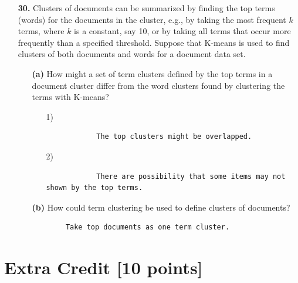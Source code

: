 \documentclass{article}
\begin{document}
\begin{enumerate}
\begin{verbatim}
	
	\end{verbatim}
	
		
	\item[\textbf{30.}] Clusters of documents can be summarized by finding the top terms (words) for the documents in the cluster, e.g., by taking the most frequent $k$ terms, where $k$ is a constant, say 10, or by taking all terms that occur more frequently than a specified threshold. Suppose that K-means is used to find clusters of both documents and words for a document data set.
	\begin{enumerate}
		\item [\textbf{(a)}] How might a set of term clusters defined by the top terms in a document cluster differ from the word clusters found by clustering the terms with K-means?
		\begin{enumerate}
			\item [1)]
			\begin{verbatim}
			The top clusters might be overlapped.
			\end{verbatim}
			\item [2)]
			\begin{verbatim}
			There are possibility that some items may not shown by the top terms.
			\end{verbatim}
		\end{enumerate}
		\item [\textbf{(b)}] How could term clustering be used to define clusters of documents?
		\begin{verbatim}
		Take top documents as one term cluster.
		\end{verbatim}
	\end{enumerate}
\end{enumerate}


\pagebreak
  \section*{Extra Credit [10 points]} 
\end{document}
